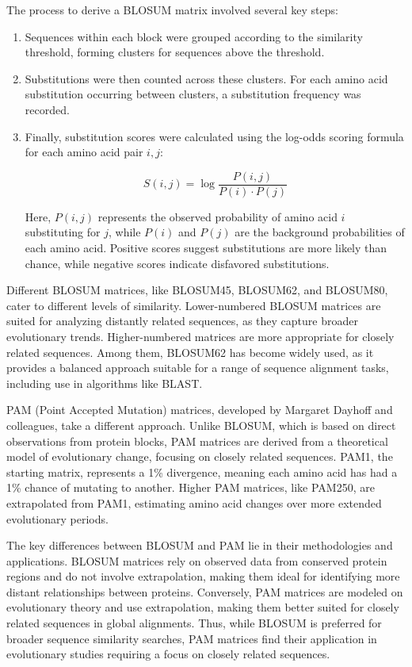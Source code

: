 The process to derive a BLOSUM matrix involved several key steps:
\begin{enumerate}
    \item Sequences within each block were grouped according to the similarity threshold, forming clusters for sequences above the threshold.
    \item Substitutions were then counted across these clusters. For each amino acid substitution occurring between clusters, a substitution frequency was recorded.
    \item Finally, substitution scores were calculated using the log-odds scoring formula for each amino acid pair $i, j$:
    
    \begin{equation}
    S(i, j) = \log \frac{P(i, j)}{P(i) \cdot P(j)}
    \end{equation}
    
    Here, $P(i, j)$ represents the observed probability of amino acid $i$ substituting for $j$, while $P(i)$ and $P(j)$ are the background probabilities of each amino acid. Positive scores suggest substitutions are more likely than chance, while negative scores indicate disfavored substitutions.
\end{enumerate}

Different BLOSUM matrices, like BLOSUM45, BLOSUM62, and BLOSUM80, cater to different levels of similarity. Lower-numbered BLOSUM matrices are suited for analyzing distantly related sequences, as they capture broader evolutionary trends. Higher-numbered matrices are more appropriate for closely related sequences. Among them, BLOSUM62 has become widely used, as it provides a balanced approach suitable for a range of sequence alignment tasks, including use in algorithms like BLAST.

PAM (Point Accepted Mutation) matrices, developed by Margaret Dayhoff and colleagues, take a different approach. 
Unlike BLOSUM, which is based on direct observations from protein blocks, PAM matrices are derived from a theoretical model of evolutionary change, focusing on closely related sequences. PAM1, the starting matrix, represents a 1\% divergence, meaning each amino acid has had a 1\% chance of mutating to another. Higher PAM matrices, like PAM250, are extrapolated from PAM1, estimating amino acid changes over more extended evolutionary periods.

The key differences between BLOSUM and PAM lie in their methodologies and applications. BLOSUM matrices rely on observed data from conserved protein regions and do not involve extrapolation, making them ideal for identifying more distant relationships between proteins. Conversely, PAM matrices are modeled on evolutionary theory and use extrapolation, making them better suited for closely related sequences in global alignments. Thus, while BLOSUM is preferred for broader sequence similarity searches, PAM matrices find their application in evolutionary studies requiring a focus on closely related sequences.